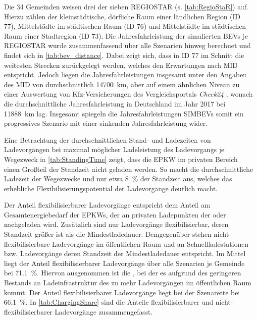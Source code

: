 Die \num{34} Gemeinden weisen drei der sieben \gls{REGIOSTAR} (s. \autoref{tab:RegioStaR}) auf.
Hierzu zählen der kleinstädtische, dörfliche Raum einer ländlichen Region (\gls{ID} \num{77}), Mittelstädte im städtischen Raum (\gls{ID} \num{76}) und Mittelstädte im städtischen Raum einer Stadtregion (\gls{ID} \num{73}).
Die Jahresfahrleistung der simulierten \glspl{BEV} je \gls{REGIOSTAR} wurde zusammenfassend über alle Szenarien hinweg berechnet und findet sich in \autoref{tab:bev_distance}.
Dabei zeigt sich, dass in \gls{ID} \num{77} im Schnitt die weitesten Strecken zurückgelegt werden, welches den Erwartungen nach \gls{MID} \cite{Nobis2019} entspricht.
Jedoch liegen die Jahresfahrleistungen insgesamt unter den Angaben des \gls{MID} von durchschnittlich \SI{14700}{\km}, aber auf einem ähnlichen Niveau zu einer Auswertung von Kfz-Versicherungen des Vergleichsportals \textit{Check24} \cite{CHECK24GmbH2018}, wonach die durchschnittliche Jahresfahrleistung in Deutschland im Jahr \num{2017} bei \SI{11888}{\km} lag.
Insgesamt spiegeln die Jahresfahrleistungen \glspl{SIMBEV} somit ein progressives Szenario mit einer sinkenden Jahresfahrleistung wider.




Eine Betrachtung der durchschnittlichen Stand- und Ladezeiten von Ladevorgängen bei maximal möglicher Ladeleistung des Ladevorgangs je Wegezweck in \autoref{tab:StandingTime} zeigt, dass die \gls{EPKW} im privaten Bereich einen Großteil der Standzeit nicht geladen werden.
So macht die durchschnittliche Ladezeit der Wegezwecke \nH und \Arbeit nur etwa \SI{8}{\percent} der Standzeit aus, welches das erhebliche Flexibilisierungspotential der Ladevorgänge deutlich macht.



Der Anteil flexibilisierbarer Ladevorgänge entspricht dem Anteil am Gesamtenergiebedarf der \glspl{EPKW}, der an privaten Ladepunkten der \UCs \zH oder \Firmeparkplatz nachgeladen wird.
Zusätzlich sind nur Ladevorgänge flexibilisierbar, deren Standzeit größer ist als die Mindestladedauer.
Demgegenüber stehen nicht-flexibilisierbare Ladevorgänge im öffentlichen Raum und an Schnellladestationen bzw. Ladevorgänge deren Standzeit der Mindestladedauer entspricht.
Im Mittel liegt der Anteil flexibilisierbarer Ladevorgänge über alle Szenarien je Gemeinde bei \SI{71.1}{\percent}.
Hiervon ausgenommen ist die \SzeFirmenparkplatzdot, bei der es aufgrund des geringeren Bestands an Ladeinfrastruktur des \UC \Firmeparkplatz zu mehr Ladevorgängen im öffentlichen Raum kommt.
Der Anteil flexibilisierbarer Ladevorgänge liegt bei der Szenarette bei \SI{66.1}{\percent}.
In \autoref{tab:ChargingShare} sind die Anteile flexibilisierbarer und nicht-flexibilisierbarer Ladevorgänge zusammengefasst.

